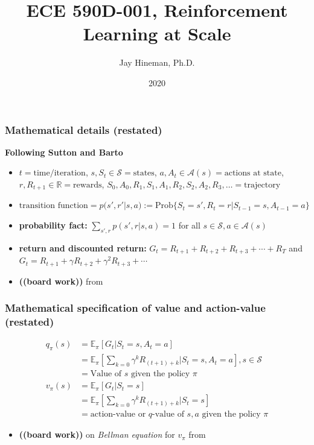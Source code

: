 \documentclass{beamer}
\title{ECE 590D-001, Reinforcement Learning at Scale}
\author{Jay Hineman, Ph.D.}
\institute{Geometric Data Analytics}
\date{2020}
\begin{document}
\frame{\titlepage}
\begin{frame}
  \frametitle{Mathematical details (restated) \cite{Sutton2018}}
  {\bf Following Sutton and Barto \cite{Sutton2018}}
  \begin{itemize}
  \item $t=\text{time/iteration}$, $s, S_t \in \mathcal{S} = \text{states}$, $a, A_t \in \mathcal{A}(s) = \text{actions at state}$, $r, R_{t+1} \in \mathbb{R} = \text{rewards}$,
    $S_0, A_0, R_1, S_1, A_1, R_2, S_2, A_2, R_3, \ldots = \text{trajectory}$
  \item $\text{transition function} = p(s', r'| s, a) := \text{Prob}\{S_t = s', R_t = r | S_{t-1} = s, A_{t-1} = a\}$
  \item {\bf probability fact:} $\sum_{s',r} p(s',r | s, a) = 1$ for all $s \in \mathcal{S}, a \in \mathcal{A}(s)$
  \item {\bf return and discounted return:} $G_t = R_{t+1} + R_{t+2} + R_{t+3} + \cdots + R_{T}$ and $G_t = R_{t+1} + \gamma R_{t+2} + \gamma^2 R_{t+3} + \cdots$
  \item {\bf ((board work))} from \cite{Sutton2018}
  \end{itemize}
\end{frame}


\begin{frame}
  \frametitle{Mathematical specification of value and action-value (restated)}
  \begin{equation}
    \begin{aligned}
      q_\pi(s) &= \mathbb{E}_\pi[G_t|S_t = s, A_t = a] \\
      &= \mathbb{E}_\pi [\sum_{k=0} \gamma^k R_{(t + 1) + k} | S_t = s, A_t = a ], s \in \mathcal{S} \\
      &= \text{Value of $s$ given the policy $\pi$} \\
      v_\pi(s) &= \mathbb{E}_\pi[G_t|S_t = s] \\
      &= \mathbb{E}_\pi [\sum_{k=0} \gamma^k R_{(t + 1) + k} | S_t = s ] \\
      &= \text{action-value or $q$-value of $s,a$ given the policy $\pi$}
    \end{aligned}
  \end{equation}
  \begin{itemize}
  \item {\bf ((board work))} on {\em Bellman equation} for $v_\pi$ from \cite{Sutton2018}
  \end{itemize}
\end{frame}
\end{document}
